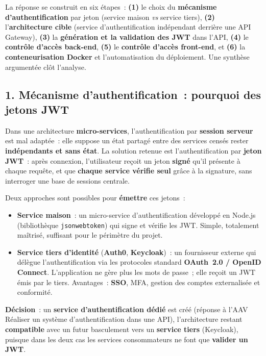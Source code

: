 \vspace{0.3cm}

\noindent La réponse se construit en six étapes~: \textbf{(1)} le choix du \textbf{mécanisme d'authentification} par jeton (service maison \textit{vs} service tiers), \textbf{(2)} l'\textbf{architecture cible} (service d'authentification indépendant derrière une API Gateway), \textbf{(3)} la \textbf{génération et la validation des JWT} dans l'API, \textbf{(4)} le \textbf{contrôle d'accès back-end}, \textbf{(5)} le \textbf{contrôle d'accès front-end}, et \textbf{(6)} la \textbf{conteneurisation Docker} et l'automatisation du déploiement. Une synthèse argumentée clôt l'analyse.

\vspace{0.4cm}

\subsection*{1. Mécanisme d'authentification~: pourquoi des jetons JWT}
{}
\noindent Dans une architecture \textbf{micro-services}, l'authentification par \textbf{session serveur} est mal adaptée~: elle suppose un état partagé entre des services censés rester \textbf{indépendants et sans état}. La solution retenue est l'authentification par \textbf{jeton JWT}~: après connexion, l'utilisateur reçoit un jeton \textbf{signé} qu'il présente à chaque requête, et que \textbf{chaque service vérifie seul} grâce à la signature, sans interroger une base de sessions centrale.

\noindent Deux approches sont possibles pour \textbf{émettre} ces jetons~:
\begin{itemize}
	\item \textbf{Service maison}~: un micro-service d'authentification développé en Node.js (bibliothèque \texttt{jsonwebtoken}) qui signe et vérifie les JWT. Simple, totalement maîtrisé, suffisant pour le périmètre du projet.
	\item \textbf{Service tiers d'identité} (\textbf{Auth0}, \textbf{Keycloak})~: un fournisseur externe qui délègue l'authentification via les protocoles standard \textbf{OAuth~2.0 / OpenID Connect}. L'application ne gère plus les mots de passe~; elle reçoit un JWT émis par le tiers. Avantages~: \textbf{SSO}, MFA, gestion des comptes externalisée et conformité.
\end{itemize}
\noindent \textbf{Décision}~: un \textbf{service d'authentification dédié} est créé (réponse à l'AAV \og{}Réaliser un système d'authentification dans une API\fg{}), l'architecture restant \textbf{compatible} avec un futur basculement vers un \textbf{service tiers} (Keycloak), puisque dans les deux cas les services consommateurs ne font que \textbf{valider un JWT}.

